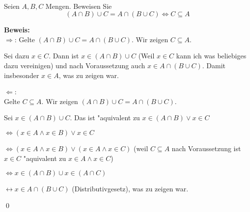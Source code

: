 \newcommand{\printpraesenzlsg}{false}
\newcommand{\printloesungen}{false}
\newcommand{\printbewertungen}{false}
\newcommand{\blattnummer}{1}



\iforiginal{}

	


\\
Seien $A,B,C$ Mengen. Beweisen Sie \[(A\cap B)\cup C=A\cap (B\cup C)\Leftrightarrow C\subseteq A\]

\begin{loesung}
  \textbf{Beweis:}\\
\glqq $\Rightarrow$\grqq: Gelte $(A\cap B)\cup C=A\cap(B\cup C)$. Wir zeigen $C\subseteq A$.

Sei dazu $x\in C$. Dann ist $x\in (A\cap B)\cup C$ (Weil $x\in C$ kann ich was beliebiges dazu vereinigen) und nach Voraussetzung auch 
$x\in A\cap (B\cup C)$. Damit insbesonder $x\in A$, was zu zeigen war.

\glqq $\Leftarrow$\grqq:\\
Gelte $C\subseteq A$. Wir zeigen $(A\cap B)\cup C=A\cap(B\cup C)$.

Sei $x\in (A\cap B)\cup C$. Das ist "aquivalent zu $x\in (A\cap B)\vee x\in C$

$\Leftrightarrow (x\in A\wedge x\in B)\vee x\in C$

$\Leftrightarrow (x\in A\wedge x\in B)\vee (x\in A\wedge x\in C)$ (weil $C\subseteq A$ nach Voraussetzung ist $x\in C$ "aquivalent zu $x\in A\wedge x\in C$)

$\Leftrightarrow x\in (A\cap B)\cup x\in (A\cap C)$

$\leftrightarrow x\in A\cap(B\cup C)$ (Distributivgesetz), was zu zeigen war.

\qed

\end{loesung}

